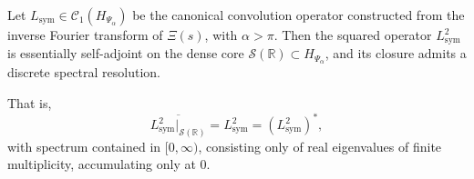 \begin{lemma}
\label{lem:Lsym_square_selfadjoint}
Let \( L_{\mathrm{sym}} \in \mathcal{C}_1(H_{\Psi_\alpha}) \) be the canonical convolution operator constructed from the inverse Fourier transform of \( \Xi(s) \), with \( \alpha > \pi \). Then the squared operator \( L_{\mathrm{sym}}^2 \) is essentially self-adjoint on the dense core \( \mathcal{S}(\mathbb{R}) \subset H_{\Psi_\alpha} \), and its closure admits a discrete spectral resolution.

That is,
\[
\overline{L_{\mathrm{sym}}^2|_{\mathcal{S}(\mathbb{R})}} = L_{\mathrm{sym}}^2 = \left( L_{\mathrm{sym}}^2 \right)^*,
\]
with spectrum contained in \( [0, \infty) \), consisting only of real eigenvalues of finite multiplicity, accumulating only at 0.
\end{lemma}
